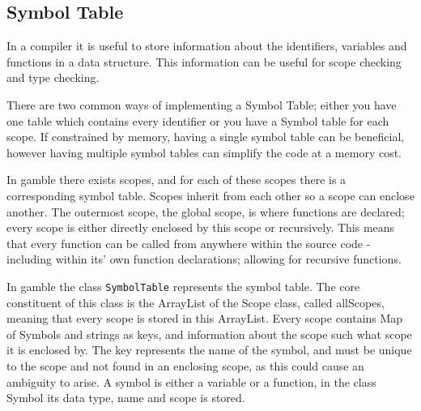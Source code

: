 \subsection*{Symbol Table}
In a compiler it is useful to store information about the identifiers, variables and functions in a data structure. 
This information can be useful for scope checking and type checking.

There are two common ways of implementing a Symbol Table; either you have one table which contains every identifier or you have a Symbol table for each scope. 
If constrained by memory, having a single symbol table can be beneficial, however having multiple symbol tables can simplify the code at a memory cost. 

In \gls{gamble} there exists scopes, and for each of these scopes there is a corresponding symbol table. 
Scopes inherit from each other so a scope can enclose another. 
The outermost scope, the global scope, is where functions are declared; every scope is either directly enclosed by this scope or recursively.
This means that every function can be called from anywhere within the source code - including within its' own function declarations; allowing for recursive functions. 
  

In \gls{gamble} the class \texttt{SymbolTable} represents the symbol table.
The core constituent of this class is the ArrayList of the Scope class, called allScopes, meaning that every scope is stored in this ArrayList.
Every scope contains Map of Symbols and strings as keys, and information about the scope such what scope it is enclosed by. 
The key represents the name of the symbol, and must be unique to the scope and not found in an enclosing scope, as this could cause an ambiguity to arise. 
A symbol is either a variable or a function, in the class Symbol its data type, name and scope is stored. 
